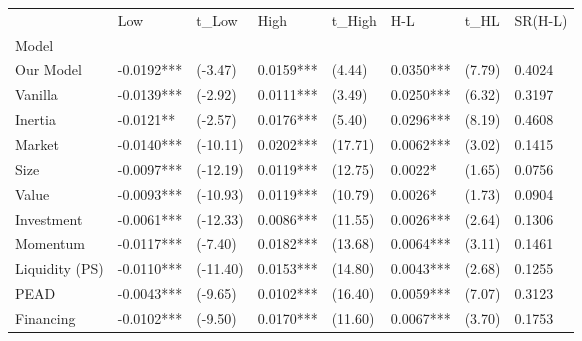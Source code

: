 \begin{tabular}{llllllll}
\toprule
{} &         Low &     t\_Low &       High &   t\_High &        H-L &    t\_HL & SR(H-L) \\
Model          &             &           &            &          &            &         &         \\
\midrule
Our Model      &  -0.0192*** &   (-3.47) &  0.0159*** &   (4.44) &  0.0350*** &  (7.79) &  0.4024 \\
Vanilla        &  -0.0139*** &   (-2.92) &  0.0111*** &   (3.49) &  0.0250*** &  (6.32) &  0.3197 \\
Inertia        &   -0.0121** &   (-2.57) &  0.0176*** &   (5.40) &  0.0296*** &  (8.19) &  0.4608 \\
Market         &  -0.0140*** &  (-10.11) &  0.0202*** &  (17.71) &  0.0062*** &  (3.02) &  0.1415 \\
Size           &  -0.0097*** &  (-12.19) &  0.0119*** &  (12.75) &    0.0022* &  (1.65) &  0.0756 \\
Value          &  -0.0093*** &  (-10.93) &  0.0119*** &  (10.79) &    0.0026* &  (1.73) &  0.0904 \\
Investment     &  -0.0061*** &  (-12.33) &  0.0086*** &  (11.55) &  0.0026*** &  (2.64) &  0.1306 \\
Momentum       &  -0.0117*** &   (-7.40) &  0.0182*** &  (13.68) &  0.0064*** &  (3.11) &  0.1461 \\
Liquidity (PS) &  -0.0110*** &  (-11.40) &  0.0153*** &  (14.80) &  0.0043*** &  (2.68) &  0.1255 \\
PEAD           &  -0.0043*** &   (-9.65) &  0.0102*** &  (16.40) &  0.0059*** &  (7.07) &  0.3123 \\
Financing      &  -0.0102*** &   (-9.50) &  0.0170*** &  (11.60) &  0.0067*** &  (3.70) &  0.1753 \\
\bottomrule
\end{tabular}
